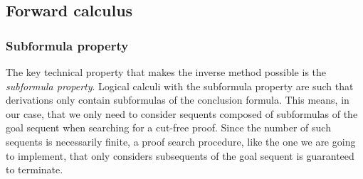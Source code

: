 

\subsection{Forward calculus}

\subsubsection{Subformula property}

The key technical property that makes the inverse method possible is the
\emph{subformula property}. Logical calculi with the subformula property are
such that derivations only contain subformulas of the conclusion formula. This
means, in our case, that we only need to consider sequents composed of
subformulas of the goal sequent when searching for a cut-free proof. Since the
number of such sequents is necessarily finite, a proof search procedure, like the
one we are going to implement, that only considers subsequents of the goal
sequent is guaranteed to terminate.


